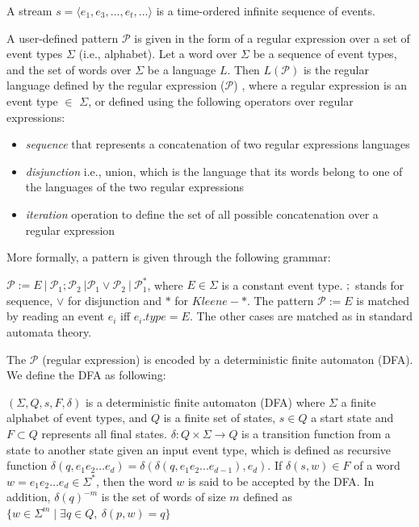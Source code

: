 \begin{definition}
A stream $s=\langle e_1,e_3,...,e_t,...\rangle$  is a time-ordered infinite sequence of events.
\end{definition}


\par A user-defined pattern $\mathcal{P}$ is given in the form of a regular expression over a set of event types $\Sigma$ (i.e., alphabet). Let a word over $\Sigma$ be a sequence of event types, and the set of words over $\Sigma$ be a language $L$. Then $L(\mathcal{P})$ is the regular language defined by the regular expression ($\mathcal{P}$) \cite{hopcroft2006automata,nuel_pattern_2008,alevizos2017event},  where a regular expression is an event type $\in$ $\Sigma$, or defined using the following operators over regular expressions:
 
\begin{itemize}[noitemsep]
	\item \textit{sequence} that represents a concatenation of two regular expressions languages 
	\item \textit{disjunction} i.e., union, which is the language that its words belong to one of the languages of the two regular expressions 
	\item \textit{iteration} operation to define the set of all possible concatenation over a regular expression
\end{itemize}

More formally, a pattern is given through the following grammar:
\begin{definition}
$\mathcal{P} := E\ |\ \mathcal{P}_{1} ; \mathcal{P}_{2}\ | \mathcal{P}_{1} \vee \mathcal{P}_{2}\ |\ \mathcal{P}_{1}^{*}  $, where $E \in \Sigma$ is a constant event type. $;$ stands for sequence, $\vee$ for disjunction and $*$ for $\mathit{Kleene}-*$.
The pattern $\mathcal{P} := E$ is matched by reading an event $e_i$ iff $e_{i}.type = E$.
The other cases are matched as in standard automata theory.
\end{definition}


The $\mathcal{P}$ (regular expression) is encoded by a deterministic finite automaton (DFA). We define the DFA as following: 

\begin{definition}
	$(\Sigma,Q,s,F,\delta)$ is a deterministic finite automaton (DFA)  where  $\Sigma$ a finite alphabet of event types, and $Q$ is a finite set of states, $s \in Q$ a start state and $F \subset Q$ represents all final states. $\delta: Q \times \Sigma \rightarrow Q$ is a transition function from a state to another state given an input event type, which is defined as recursive function $\delta(q,e_{1}e_{2}\ldots e_{d})=\delta(\delta(q,e_{1}e_{2}...e_{d-1}),e_{d})$. If $\delta(s,w) \in F$ of a word $w=e_{1}e_{2}\ldots e_{d} \in \Sigma^{*}$, then the word $w$ is said to be accepted by the DFA. In addition,  $\delta(q)^{-m}$ is the set of words of size $m$ defined as $\{w \in \Sigma^{m} \mid \exists q \in Q,\ \delta(p,w)=q \}$
\end{definition}


